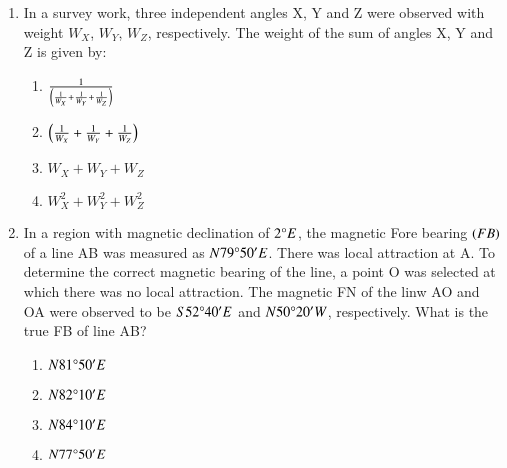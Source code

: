 \documentclass[journal,12pt,onecolumn]{IEEEtran}
\theoremstyle{remark}
\begin{document}
\begin{enumerate}
\item In a survey work, three independent angles X, Y and Z were observed with weight $W_X$, $W_Y$, $W_Z$, respectively. The weight of the sum of angles X, Y and Z is given by:
\begin{enumerate}
    \item $\frac{1}{\left({\frac{1}{W_X}} + {\frac{1}{W_Y}} + {\frac{1}{W_Z}}\right)}$
    \item $\left(\frac{1}{W_X} + \frac{1}{W_Y} + \frac{1}{W_Z}\right)$
    \item $W_X + W_Y + W_Z$
    \item $W_X^2 + W_Y^2 + W_Z^2$
\end{enumerate}
\item In a region with magnetic declination of $2\degree E$, the magnetic Fore bearing $\left(FB\right)$ of a line AB was measured as $N79\degree 50'E$. There was local attraction at A. To determine the correct magnetic bearing of the line, a point O was selected at which there was no local attraction. The magnetic FN of the linw AO and OA were observed to be $S52\degree 40'E$ and $N50\degree 20'W$, respectively. What is the true FB of line AB?
\begin{enumerate}
    \item $N81\degree 50'E$
    \item $N82\degree 10'E$
    \item $N84\degree 10'E$
    \item $N77\degree 50'E$
\end{enumerate}


\end{enumerate}
\end{document}
